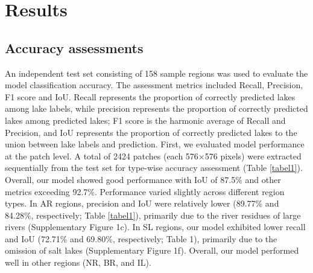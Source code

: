 \documentclass[preprint,12pt,authoryear]{elsarticle}
\begin{document}
\section{Results}
\label{sec3}

\subsection{Accuracy assessments}
\label{subsec31}

An independent test set consisting of 158 sample regions was used to evaluate the model classification accuracy. The assessment metrics included Recall, Precision, F1 score and IoU. Recall represents the proportion of correctly predicted lakes among lake labels, while precision represents the proportion of correctly predicted lakes among predicted lakes; F1 score is the harmonic average of Recall and Precision, and IoU represents the proportion of correctly predicted lakes to the union between lake labels and prediction. First, we evaluated model performance at the patch level. A total of 2424 patches (each 576×576 pixels) were extracted sequentially from the test set for type-wise accuracy assessment (Table \ref{tabel1}). Overall, our model showed good performance with IoU of 87.5\% and other metrics exceeding 92.7\%. Performance varied slightly across different region types. In AR regions, precision and IoU were relatively lower (89.77\% and 84.28\%, respectively; Table \ref{tabel1}), primarily due to the river residues of large rivers (Supplementary Figure 1c). In SL regions, our model exhibited lower recall and IoU (72.71\% and 69.80\%, respectively; Table 1), primarily due to the omission of salt lakes (Supplementary Figure 1f). Overall, our model performed well in other regions (NR, BR, and IL). 
\end{document}
